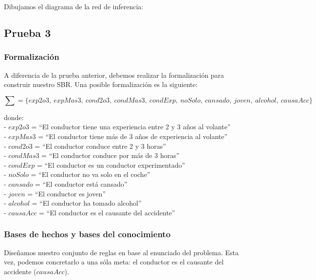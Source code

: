 \documentclass[a4paper,11pt, includehead]{article}
\begin{document}
\noindent Dibujamos el diagrama de la red de inferencia:\\
\begin{center}
	\resizebox{\textwidth}{!}{}
\end{center}

\clearpage

\subsection{Prueba 3}
\subsubsection{Formalización}
A diferencia de la prueba anterior, debemos realizar la formalización para construir nuestro SBR. Una posible formalización es la siguiente:

{\small $$\sum=\{exp2o3,\ expMas3,\ cond2o3,\ condMas3,\ condExp,\ noSolo,\ cansado,\ joven,\ alcohol,\ causaAcc\}$$}

\noindent donde:\\[1ex]
\indent - $exp2o3$ = \textquotedblleft El conductor tiene una experiencia entre 2 y 3 años al volante\textquotedblright \\
\indent - $expMas3$ = \textquotedblleft El conductor tiene más de 3 años de experiencia al volante\textquotedblright \\
\indent - $cond2o3$ = \textquotedblleft El conductor conduce entre 2 y 3 horas\textquotedblright \\
\indent - $condMas3$ = \textquotedblleft El conductor conduce por más de 3 horas\textquotedblright \\
\indent - $condExp$ = \textquotedblleft El conductor es un conductor experimentado\textquotedblright \\
\indent - $noSolo$ = \textquotedblleft El conductor no va solo en el coche\textquotedblright \\
\indent - $cansado$ = \textquotedblleft El conductor está cansado\textquotedblright \\
\indent - $joven$ = \textquotedblleft El conductor es joven\textquotedblright \\
\indent - $alcohol$ = \textquotedblleft El conductor ha tomado alcohol\textquotedblright \\
\indent - $causaAcc$ = \textquotedblleft El conductor es el causante del accidente\textquotedblright \\

\subsubsection{Bases de hechos y bases del conocimiento}
Diseñamos nuestro conjunto de reglas en base al enunciado del problema. Esta vez, podemos concretarlo a una sóla meta: el conductor es el causante del accidente ($causaAcc$).
\end{document}
